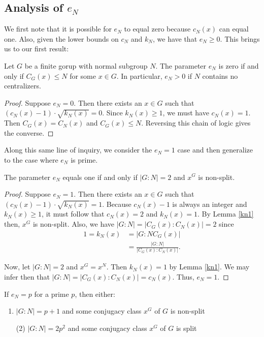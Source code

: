 \documentclass[main.tex]{subfiles}
\begin{document}
\subsection{Analysis of $e_N$}

We first note that it is possible for $e_N$ to equal zero because $c_N(x)$ can equal one. Also, given the lower bounds on $c_N$ and $k_N$, we have that $e_N \ge 0$. This brings us to our first result:

\begin{theorem}\label{en0}
Let $G$ be a finite gorup with normal subgroup $N$. The parameter $e_N$ is zero if and only if $C_G(x) \le N$ for some $x \in G$. In particular, $e_N > 0$ if $N$ contains no centralizers.
\end{theorem}

\begin{proof}
Suppose $e_N = 0$. Then there exists an $x \in G$ such that $(c_N(x) - 1) \cdot \sqrt{k_N(x)} = 0$. Since $k_N(x) \ge 1$, we must have $c_N(x) = 1$. Then $C_G(x) = C_N(x)$ and $C_G(x) \le N$. Reversing this chain of logic gives the converse.
\end{proof}

Along this same line of inquiry, we consider the $e_N = 1$ case and then generalize to the case where $e_N$ is prime.

\begin{theorem}\label{en1}
The parameter $e_N$ equals one if and only if $|G:N| = 2$ and $x^G$ is non-split.
\end{theorem}

\begin{proof}
Suppose $e_N = 1$. Then there exists an $x \in G$ such that $(c_N(x) - 1) \cdot \sqrt{k_N(x)} = 1$. Because $c_N(x) - 1$ is always an integer and $k_N(x) \ge 1$, it must follow that $c_N(x) = 2$ and $k_N(x) = 1$. By Lemma \ref{kn1} then, $x^G$ is non-split. Also, we have $|G : N| = |C_G(x) : C_N(x)| = 2$ since
\begin{align*}
1 = k_N(x) &= |G : NC_G(x)| \\
&= \frac{|G : N|}{|C_G(x) : C_N(x)|} \text{.}
\end{align*}

Now, let $|G:N| = 2$ and $x^G = x^N$. Then $k_N(x) = 1$ by Lemma \ref{kn1}. We may infer then that $|G : N| = |C_G(x) : C_N(x)| = c_N(x)$. Thus, $e_N = 1$. 
\end{proof}

\begin{theorem}
If $e_N = p$ for a prime $p$, then either:
\begin{enumerate}
	\item $|G:N| = p + 1$ and some conjugacy class $x^G$ of $G$ is non-split
	\item[(2)] $|G:N| = 2p^2$ and some conjugacy class $x^G$ of $G$ is split
\end{enumerate}
\end{theorem}
\end{document}
